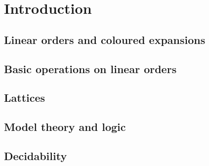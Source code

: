\chapter{Introduction}


\section{Linear orders and coloured expansions}


\section{Basic operations on linear orders}


\section{Lattices}


\section{Model theory and logic}


\section{Decidability}
